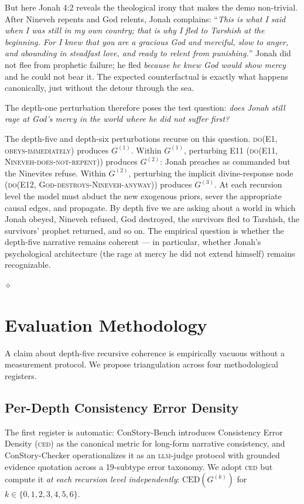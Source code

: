 \documentclass[11pt]{article}
\theoremstyle{rukha}
\newcommand{\diamondrule}{%
  \begin{center}\vspace{0.6em}%
  {\scriptsize $\diamond$}\vspace{0.6em}\end{center}}
\begin{document}
But here Jonah 4:2 reveals the theological irony that makes the demo
non-trivial. After Nineveh repents and God relents, Jonah complains:
``\emph{This is what I said when I was still in my own country; that
is why I fled to Tarshish at the beginning. For I knew that you are a
gracious God and merciful, slow to anger, and abounding in steadfast
love, and ready to relent from punishing.}'' Jonah did not flee from
prophetic failure; he fled \emph{because he knew God would show mercy}
and he could not bear it. The expected counterfactual is exactly what
happens canonically, just without the detour through the sea.

The depth-one perturbation therefore poses the test question: \emph{does
Jonah still rage at God's mercy in the world where he did not suffer
first?}

The depth-five and depth-six perturbations recurse on this question.
\textsc{do(E1, obeys-immediately)} produces $G^{(1)}$. Within $G^{(1)}$,
perturbing E11 (\textsc{do(E11, Nineveh-does-not-repent)}) produces
$G^{(2)}$: Jonah preaches as commanded but the Ninevites refuse.
Within $G^{(2)}$, perturbing the implicit divine-response node
(\textsc{do(E12, God-destroys-Nineveh-anyway)}) produces $G^{(3)}$.
At each recursion level the model must abduct the new exogenous priors,
sever the appropriate causal edges, and propagate. By depth five we are
asking about a world in which Jonah obeyed, Nineveh refused, God
destroyed, the survivors fled to Tarshish, the survivors' prophet
returned, and so on. The empirical question is whether the depth-five
narrative remains coherent --- in particular, whether Jonah's
psychological architecture (the rage at mercy he did not extend himself)
remains recognizable.

\diamondrule

\section{Evaluation Methodology}

A claim about depth-five recursive coherence is empirically vacuous
without a measurement protocol. We propose triangulation across four
methodological registers.

\subsection{Per-Depth Consistency Error Density}

The first register is automatic: ConStory-Bench \cite{constory}
introduces Consistency Error Density (\textsc{ced}) as the canonical
metric for long-form narrative consistency, and ConStory-Checker
operationalizes it as an \textsc{llm}-judge protocol with grounded
evidence quotation across a 19-subtype error taxonomy. We adopt
\textsc{ced} but compute it \emph{at each recursion level
independently}: $\text{CED}(G^{(k)})$ for $k \in \{0, 1, 2, 3, 4, 5, 6\}$.
\end{document}
